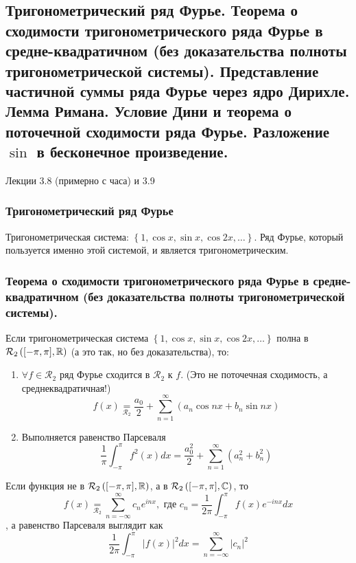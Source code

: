 \newcommand{\darrowwtextover}[3]{%
\raisebox{0pt}[0pt][0pt]{%
$\overset{\mathclap{\substack{#1\\\left\downarrow\vcenter{\hrule height #2}\right.}}}{#3}%
$}%
}

\subsection{Тригонометрический ряд Фурье.
Теорема о сходимости тригонометрического ряда Фурье в средне-квадратичном (без доказательства полноты тригонометрической системы).
Представление частичной суммы ряда Фурье через ядро Дирихле.
Лемма Римана.
Условие Дини и теорема о поточечной сходимости ряда Фурье.
Разложение $\sin$ в бесконечное произведение.}

Лекции 3.8 (примерно с часа) и 3.9

\subsubsection{Тригонометрический ряд Фурье}

Тригонометрическая система: $\left\{ 1, \cos x, \sin x, \cos 2x, \dotsc \right\}$.
Ряд Фурье, который пользуется именно этой системой, и является тригонометрическим.

\subsubsection{Теорема о сходимости тригонометрического ряда Фурье в средне-квадратичном
(без доказательства полноты тригонометрической системы).}

Если тригонометрическая система $\left\{ 1, \cos x, \sin x, \cos 2x, \dotsc \right\}$ полна
в $\mathcal{R}_2 \left( [-\pi, \pi], \mathbb{R} \right)$
(а это так, но без доказательства), то:
\begin{enumerate}
\item
$\forall f \in \mathcal{R}_2$ ряд Фурье сходится в $\mathcal{R}_2$ к $f$.
(Это не поточечная сходимость, а среднеквадратичная!)
\[
    f(x) \underset{\mathcal{R}_2}{=} \frac{a_0}{2} +
    \sum_{n=1}^{\infty} \left( a_n \cos nx + b_n \sin nx \right)
\]
\item
Выполняется равенство Парсеваля
\[
    \frac{1}{\pi} \int_{-\pi}^{\pi} f^2(x) dx = \frac{a_0^2}{2} +
    \sum_{n=1}^{\infty} \left( a_n^2 + b_n^2 \right)
\]
\end{enumerate}

Если функция не в $\mathcal{R}_2 \left( [-\pi, \pi], \mathbb{R} \right)$, а в
$\mathcal{R}_2 \left( [-\pi, \pi], \mathbb{C} \right)$, то
\[
    f(x) \underset{\mathcal{R}_2}{=} \sum_{n=-\infty}^{\infty} c_n e^{inx},
    \text{ где } c_n = \frac{1}{2\pi} \int_{-\pi}^{\pi} f(x) e^{-inx} dx
\]
, а равенство Парсеваля выглядит как
\[
    \frac{1}{2\pi} \int_{-\pi}^{\pi} |f(x)|^2 dx =
    \sum_{n=-\infty}^{\infty} |c_n|^2
\]

